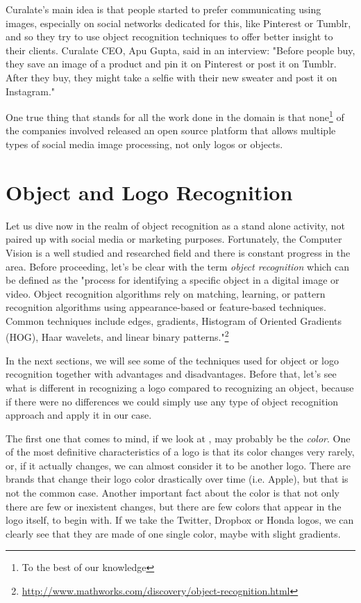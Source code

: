 Curalate's main idea is that people started to prefer communicating using
images, especially on social networks dedicated for this, like Pinterest or
Tumblr, and so they try to use object recognition techniques to offer better
insight to their clients. Curalate CEO, Apu Gupta, said in an interview:
"Before people buy, they save an image of a product and pin it on Pinterest
or post it on Tumblr. After they buy, they might take a selfie with their new
sweater and post it on Instagram."

One true thing that stands for all the work done in the domain is that
none\footnote{To the best of our knowledge} of the companies involved released
an open source platform that allows multiple types of social media image
processing, not only logos or objects.

\section{Object and Logo Recognition}

Let us dive now in the realm of object recognition as a stand alone activity,
not paired up with social media or marketing purposes. Fortunately, the
Computer Vision is a well studied and researched field and there is constant
progress in the area. Before proceeding, let's be clear with the term
\textit{object recognition} which can be defined as the "process for
identifying a specific object in a digital image or video. Object recognition
algorithms rely on matching, learning, or pattern recognition algorithms using
appearance-based or feature-based techniques. Common techniques include edges,
gradients, Histogram of Oriented Gradients (HOG), Haar wavelets, and linear
binary patterns."\footnote{\url{http://www.mathworks.com/discovery/object-recognition.html}}

In the next sections, we will see some of the techniques used for object or
logo recognition together with advantages and disadvantages. Before that,
let's see what is different in recognizing a logo compared to recognizing an
object, because if there were no differences we could simply use any type of
object recognition approach and apply it in our case. 

The first one that comes to mind, if we look at
, may probably be the \textit{color}. One of the most
definitive characteristics of a logo is that its color changes very rarely,
or, if it actually changes, we can almost consider it to be another logo. There are
brands that change their logo color drastically over time (i.e. Apple), but
that is not the common case. Another important fact about the color is that
not only there are few or inexistent changes, but there are few colors that
appear in the logo itself, to begin with. If we take the Twitter, Dropbox or
Honda logos, we can clearly see that they are made of one single color, maybe
with slight gradients.

